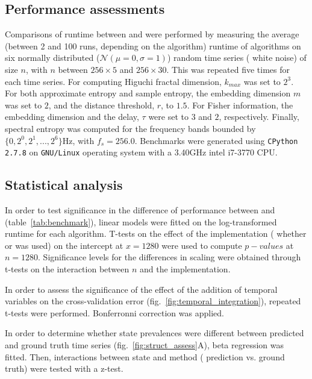 \subsection{Performance assessments}
Comparisons of runtime between \pr{} and \pyeeg{}\cite{bao_pyeeg:_2011} were performed by
measuring the average (between 2 and 100 runs, depending on the algorithm) runtime of algorithms on six normally distributed ($\mathcal{N}(\mu=0,\sigma=1)$) random time series (\ie{} white noise) of size $n$,
with $n$ between $256 \times{} 5$ and $256 \times{} 30$.
This was repeated five times for each time series.
For computing  Higuchi fractal dimension\cite{higuchi_approach_1988}, $k_{max}$
was set to $2^3$.
For both approximate entropy and sample
entropy\cite{richman_physiological_2000}, the embedding dimension $m$ was set to $2$, and the distance threshold, $r$, to $1.5$.
For Fisher information, the embedding dimension and the delay, $\tau$ were set to $3$ and $2$, respectively.
Finally, spectral entropy was computed for the frequency bands bounded by $\{0, 2^0, 2^1, ..., 2^6\}$Hz, with $f_s = 256.0$.
Benchmarks were generated using \texttt{CPython 2.7.8} on \texttt{GNU/Linux} operating system with a 3.40GHz intel i7-3770 CPU.

\subsection{Statistical analysis}
In order to test significance in the difference of performance between \pr{} and \pyeeg{} (table~\ref{tab:benchmark}),
linear models were fitted on the log-transformed runtime for each algorithm. 
T-tests on the effect of the implementation (\ie{} whether \pr{} or \pyeeg{} was used) on the intercept at $x=1280$ were used to compute $p-values$ at $n=1280$.
Significance levels for the differences in scaling were obtained through t-tests on the interaction between $n$ and the implementation.


In order to assess the significance of the effect of the addition of temporal variables on the cross-validation
error (fig.~\ref{fig:temporal_integration}), repeated t-tests were performed.
Bonferronni correction was applied.

In order to determine whether state prevalences were different between predicted and ground truth time series (fig.~\ref{fig:struct_assess}A),
beta regression \cite{cribari-neto_beta_2009} was fitted. 
Then, interactions between state and method (\ie{} prediction vs. ground truth) were tested with a z-test.

